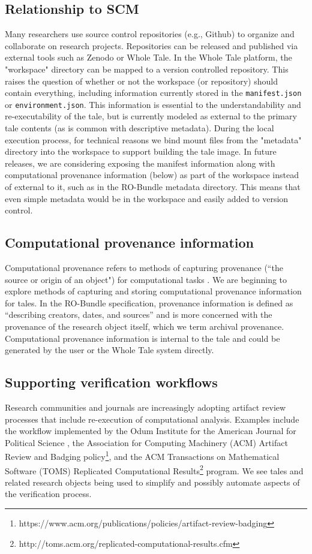 \documentclass[conference]{IEEEtran}
\begin{document}
\subsection{Relationship to SCM}
Many researchers use source control repositories (e.g., Github) to organize and collaborate on research projects. Repositories can be released and published via external tools such as Zenodo or Whole Tale. In the Whole Tale platform, the "workspace" directory can be mapped to a version controlled  repository. This raises the question of whether or not the workspace (or repository) should contain everything, including information currently stored in the \texttt{manifest.json} or \texttt{environment.json}.  This information is essential to the understandability and re-executability of the tale, but is currently modeled as external to the primary tale contents (as is common with descriptive metadata). During the local execution process, for technical reasons we 
bind mount files from the "metadata" directory into the workspace to support building the tale 
image.  In future releases, we are considering exposing the manifest information along with 
computational provenance information (below) as part of the workspace instead of external to it, such as in the RO-Bundle metadata directory.  This means that even simple metadata would be in the workspace and easily added to version control.

\subsection{Computational provenance information}
Computational provenance refers to methods of capturing provenance (``the source or origin of an object") for computational tasks \cite{freire2008}. We are beginning to explore methods of capturing and storing computational provenance information for tales. In the RO-Bundle specification, provenance information is defined as ``describing creators, dates, and sources'' and is more concerned with the provenance of the research object itself, which we term archival provenance. Computational provenance information is internal to the tale and could be generated by the user or the Whole Tale system directly. 

\subsection{Supporting verification workflows}
Research communities and journals are increasingly adopting artifact review processes that include re-execution of computational analysis. Examples include the workflow implemented by the Odum Institute for the American Journal for Political Science \cite{christian2018}, the Association for Computing Machinery (ACM) Artifact Review and Badging policy\footnote{https://www.acm.org/publications/policies/artifact-review-badging}, and the ACM Transactions on Mathematical Software (TOMS) Replicated Computational Results\footnote{http://toms.acm.org/replicated-computational-results.cfm} program. We see tales and related research objects being used to simplify and possibly automate aspects of the verification process.
\end{document}
